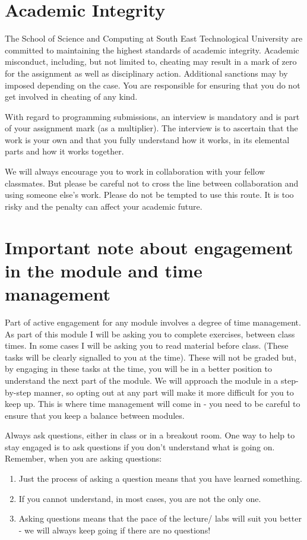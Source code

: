 \documentclass{article}
\begin{document}
\section{Academic Integrity}
The School of Science and Computing  at South East Technological University are  committed to maintaining the highest standards of academic integrity. 
Academic misconduct, including, but not limited to, cheating may result in a mark of zero for the assignment as well as disciplinary action.
Additional sanctions may by imposed depending on the case. You are responsible for ensuring that you do not get involved in cheating of any kind. 
 
With regard to programming submissions, an interview is mandatory and is part of your assignment mark (as a multiplier). 
The interview is to ascertain that the work is your own and that you fully understand how it works, in its elemental parts and how it works together. 
 
We  will always encourage you to work in collaboration with your fellow classmates. But please be careful not to cross the line between collaboration and using someone else's work. 
Please do not be tempted to use this route. 
It is too risky and the penalty can affect your academic future. 

\pagebreak
\section{Important note about engagement in the module  and time management}
 Part of active engagement  for any module involves a degree of time management. 
 As part of this module I will be asking you to complete exercises, between class times. In some cases I will be asking you to read material before class. 
 (These tasks will be clearly signalled to you at the time). These will not be graded but, by engaging in these tasks at the time, you will be in a better position to 
 understand the next part of the module. We will approach the module in a step-by-step manner, so opting out at any part will make it more difficult for you to keep up. 
 This is where time management will come in - you need to be careful to ensure that you keep a balance between modules. 
 
 Always ask questions, either in class or in a breakout room.  One way to help to stay engaged is to ask questions if you don't understand what is going on. 
 Remember, when you are asking questions:
 \begin{enumerate}
    \item Just the process of asking a question means that you have learned something. 
    \item If you cannot understand, in most cases, you are not the only one. 
    \item Asking questions means that the pace of the lecture/ labs will suit you better - we will always keep going if there are no questions! 
 \end{enumerate}
\end{document}

